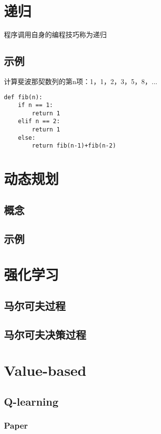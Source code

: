 \documentclass{book}
\begin{document}
\chapter{递归}
程序调用自身的编程技巧称为递归
\section{示例}
计算斐波那契数列的第n项：1，1，2，3，5，8，...
\begin{lstlisting} 
def fib(n):
    if n == 1:
        return 1
    elif n == 2:
        return 1
    else:
        return fib(n-1)+fib(n-2)
\end{lstlisting}   
\chapter{动态规划}
\section{概念}
\section{示例}
\chapter{强化学习}
\section{马尔可夫过程}
\section{马尔可夫决策过程}
\chapter{Value-based}
\section{Q-learning}
\subsection{Paper}
\end{document}
